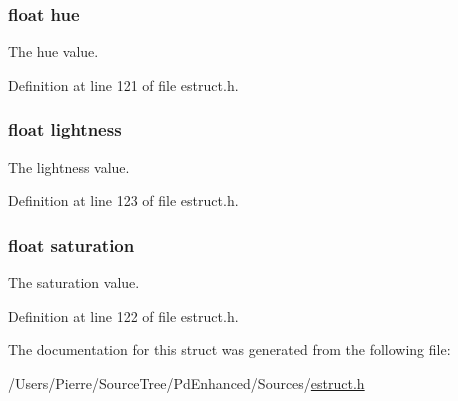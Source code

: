 \hypertarget{struct__hsla_a408d4a7316413ec687c945201a907e98}{
\subsubsection[{hue}]{\setlength{\rightskip}{0pt plus 5cm}float hue}}\label{struct__hsla_a408d4a7316413ec687c945201a907e98}
The hue value. 

Definition at line 121 of file estruct.\-h.

\hypertarget{struct__hsla_a9a22c1947d9e158ae5d791807fae36ed}{
\subsubsection[{lightness}]{\setlength{\rightskip}{0pt plus 5cm}float lightness}}\label{struct__hsla_a9a22c1947d9e158ae5d791807fae36ed}
The lightness value. 

Definition at line 123 of file estruct.\-h.

\hypertarget{struct__hsla_a953351912fb6da22fde59fe0f24909e7}{
\subsubsection[{saturation}]{\setlength{\rightskip}{0pt plus 5cm}float saturation}}\label{struct__hsla_a953351912fb6da22fde59fe0f24909e7}
The saturation value. 

Definition at line 122 of file estruct.\-h.



The documentation for this struct was generated from the following file\-:\begin{DoxyCompactItemize}
\item 
/\-Users/\-Pierre/\-Source\-Tree/\-Pd\-Enhanced/\-Sources/\hyperlink{estruct_8h}{estruct.\-h}\end{DoxyCompactItemize}
